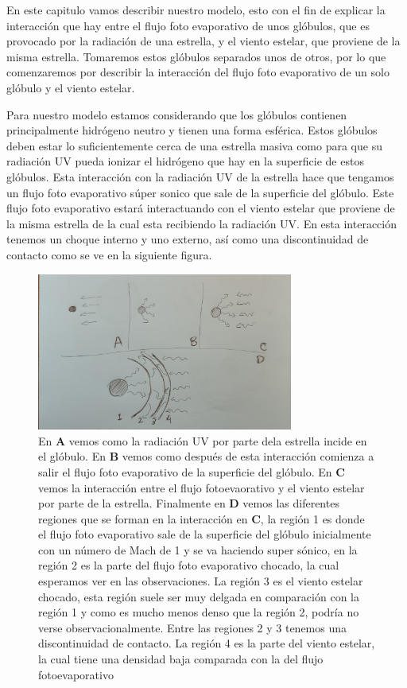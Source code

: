 \documentclass{book}
\begin{document}
En este capitulo vamos  describir nuestro modelo, esto con el fin de explicar la interacción que hay entre el flujo foto evaporativo de unos glóbulos, que es provocado por la radiación de una estrella, y el viento estelar, que proviene de la misma estrella. Tomaremos estos glóbulos separados unos de otros, por lo que comenzaremos por describir la interacción del flujo foto evaporativo de un solo glóbulo y el viento estelar.

Para nuestro modelo estamos considerando que los glóbulos contienen principalmente hidrógeno neutro y tienen una forma esférica. Estos glóbulos deben estar lo suficientemente cerca de una estrella masiva como para que su radiación UV pueda ionizar el hidrógeno que hay en la superficie de estos glóbulos. Esta interacción con la radiación UV de la estrella hace que tengamos un flujo foto evaporativo súper sonico que sale de la superficie del glóbulo. Este flujo foto evaporativo estará interactuando con el viento estelar que proviene de la misma estrella de la cual esta recibiendo la radiación UV. En esta interacción tenemos un choque interno y uno externo, así como una discontinuidad de contacto como se ve en la siguiente figura.

\begin{figure}[h]
    \centering
    \includegraphics[width=0.75\textwidth]{Chp2_zones.jpg}
    \caption{En \textbf{A} vemos como la radiación UV por parte dela estrella incide en el glóbulo. En \textbf{B} vemos como después de esta interacción comienza a salir el flujo foto evaporativo de la superficie del glóbulo. En \textbf{C} vemos la interacción entre el flujo fotoevaorativo y el viento estelar por parte de la estrella. Finalmente en \textbf{D} vemos las diferentes regiones que se forman en la interacción en \textbf{C}, la  región 1 es donde el flujo foto evaporativo sale de la superficie del glóbulo inicialmente con un número de Mach de 1 y se va haciendo super sónico, en la región 2 es la parte del flujo foto evaporativo chocado, la cual esperamos ver en las observaciones. La región 3 es el viento estelar chocado, esta región suele ser muy delgada en comparación con la región 1 y como es mucho menos denso que la región 2, podría no verse observacionalmente. Entre las regiones 2 y 3 tenemos una discontinuidad de contacto. La región 4 es la parte del viento estelar, la cual tiene una densidad baja comparada con la del flujo fotoevaporativo}
    \label{fig:zones}
\end{figure}
\end{document}
